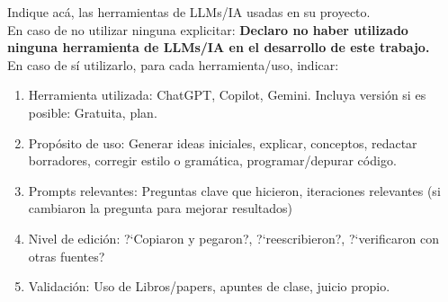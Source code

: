 Indique ac\'a, las herramientas de LLMs/IA usadas en su proyecto. \\En caso de no utilizar ninguna explicitar:
\textbf{Declaro no haber utilizado ninguna herramienta de LLMs/IA en el desarrollo de este trabajo.}\\

\noindent En caso de s\'i utilizarlo, para cada herramienta/uso, indicar:
\begin{enumerate}
\item Herramienta utilizada: ChatGPT, Copilot, Gemini. Incluya versi\'on si es posible: Gratuita, plan.
\item Prop\'osito de uso: Generar ideas iniciales, explicar,  conceptos, redactar borradores, corregir estilo o gram\'atica, programar/depurar c\'odigo.
\item Prompts relevantes: Preguntas clave que hicieron, iteraciones relevantes (si cambiaron la pregunta para mejorar resultados)
\item Nivel de edici\'on: ?`Copiaron y pegaron?, ?`reescribieron?, ?`verificaron con otras fuentes?
\item Validaci\'on: Uso de Libros/papers, apuntes de clase, juicio propio.
\end{enumerate}


